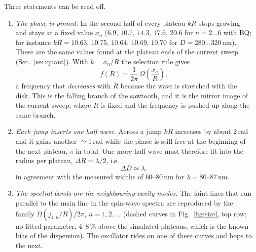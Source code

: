 \documentclass[11pt,a4paper]{article}
\begin{document}
Three statements can be read off.
\begin{enumerate}
\item \emph{The phase is pinned.}  In the second half of every plateau $kR$ stops growing and stays at a fixed
value $x_n$ ($6.9$, $10.7$, $14.3$, $17.6$, $20.6$ for $n=2\dots6$ with BQ; for instance
$kR=10.63,\,10.75,\,10.64,\,10.69,\,10.70$ for $D=280\dots320$\,nm).  These are the same values found at the plateau
ends of the current sweep (Sec.~\ref{sec:quant}).  With $k=x_n/R$ the selection rule gives
\begin{equation}
f(R)=\frac{1}{2\pi}\,\Omega\!\left(\frac{x_n}{R}\right),
\label{eq:fR}
\end{equation}
a frequency that \emph{decreases} with $R$ because the wave is stretched with the disk.  This is the falling
branch of the sawtooth, and it is the mirror image of the current sweep, where $R$ is fixed and the frequency is
pushed up along the same branch.
\item \emph{Each jump inserts one half wave.}  Across a jump $kR$ increases by about 2\,rad and it gains
another $\simeq1$\,rad while the phase is still free at the beginning of the next plateau, $\pi$ in total.
One more half wave must therefore fit into the radius per plateau, $\Delta R=\lambda/2$, i.e.
\begin{equation}
\Delta D\simeq\lambda ,
\end{equation}
in agreement with the measured widths of 60--80\,nm for $\lambda=80$--$87$\,nm.
\item \emph{The spectral bands are the neighbouring cavity modes.}  The faint lines that run parallel to the
main line in the spin-wave spectra are reproduced by the family $\Omega(j_{1,n}/R)/2\pi$, $n=1,2,\dots$
(dashed curves in Fig.~\ref{fig:size}, top row; no fitted parameter, 4--8\,\% above the simulated plateaus,
which is the known bias of the dispersion).  The oscillator rides on one of these curves and hops to the next.
\end{enumerate}
\end{document}
